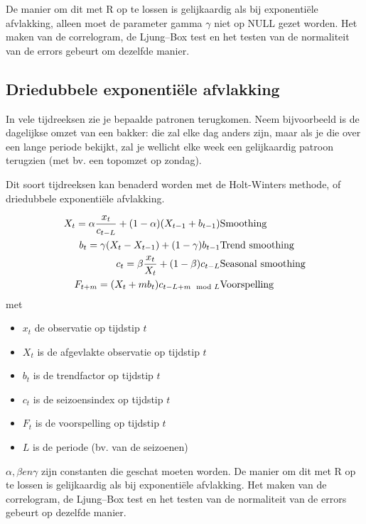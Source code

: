De manier om dit met R op te lossen is gelijkaardig als bij exponentiële afvlakking, alleen moet de parameter gamma $\gamma$ niet op NULL gezet worden. Het maken van de correlogram, de Ljung–Box test en het testen van de normaliteit van de errors gebeurt om dezelfde manier. 

\subsection{Driedubbele exponentiële afvlakking}

In vele tijdreeksen zie je bepaalde patronen terugkomen. Neem bijvoorbeeld is de dagelijkse omzet van een bakker: die zal elke dag anders zijn, maar als je die over een lange periode bekijkt, zal je wellicht elke week een gelijkaardig patroon terugzien (met bv. een topomzet op zondag).

Dit soort tijdreeksen kan benaderd worden met de Holt-Winters methode, of driedubbele exponentiële afvlakking.

\begin{eqnarray}
  X_{t} = \alpha \frac{x_{t}}{c_{t-L}} + (1-\alpha) (X_{t-1} + b_{t-1}) & \textnormal{Smoothing}\\
  b_{t} = \gamma (X_{t} - X_{t-1}) + (1-\gamma)b_{t-1} & \textnormal{Trend smoothing} \\
  c_{t} = \beta \frac{x_{t}}{X_{t}} + (1-\beta)c_{t-L} & \textnormal{Seasonal smoothing} \\
  F_{t+m} = (X_{t} + mb_{t})c_{t-L+m \mod L}  & \textnormal{Voorspelling}
  \label{eq:HoltWinters}
\end{eqnarray}
 met 
\begin{itemize}
	\item $x_{t}$ de observatie op tijdstip $t$
	\item $X_{t}$ is de afgevlakte observatie op tijdstip $t$
	\item $b_{t}$ is de trendfactor op tijdstip $t$
	\item $c_{t}$ is de seizoensindex op tijdstip $t$
	\item $F_{t}$ is de voorspelling op tijdstip $t$
	\item $L$ is de periode (bv. van de seizoenen)
\end{itemize}

$\alpha, \beta en \gamma$ zijn constanten die geschat moeten worden. 
De manier om dit met R op te lossen is gelijkaardig als bij exponentiële afvlakking. Het maken van de correlogram, de Ljung–Box test en het testen van de normaliteit van de errors gebeurt op dezelfde manier. 

